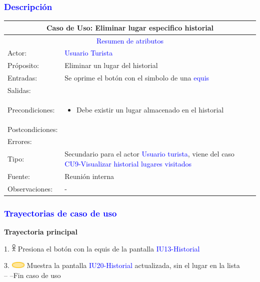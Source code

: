 \subsubsection{\textcolor{blue}{Descripción}}
\begin{tabularx}{16cm}{||l|X||}
	\hline
	\multicolumn{2}{||c||}{Caso de Uso: Eliminar lugar especifico historial} \\
	\hline
	\multicolumn{2}{||c||}{\textcolor{blue}{Resumen de atributos}} \\
	\hline
	{Actor:} & {\textcolor{blue}{Usuario Turista}} \\
	\hline
	{Próposito:} & {Eliminar un lugar del historial} \\
	\hline
	{Entradas:} & {Se oprime el botón con el simbolo de una \textcolor{blue}{equis}}\\
	\hline
	{Salidas:} & {}\\
	\hline
	{Precondiciones:} & {\begin{itemize}
	    \item Debe existir un lugar almacenado en el historial
	\end{itemize}}\\ 
	\hline
	{Postcondiciones:} & {}\\
	\hline
	{Errores:} & {} \\
	\hline
	{Tipo:} & {Secundario para el actor \textcolor{blue}{Usuario turista}, viene del caso \textcolor{blue}{CU9-Visualizar historial lugares visitados}}\\
	\hline
	{Fuente:} & {Reunión interna} \\
	\hline
	{Observaciones:} & {-} \\
	\hline
\end{tabularx}

\pagebreak
\subsubsection{\textcolor{blue}{Trayectorias de caso de uso}}
\textbf{Trayectoria principal}
    
    1. \includegraphics[width=0.0150\textwidth]{Figuras/persona.png} Presiona el botón con la equis de la pantalla \textcolor{blue}{IU13-Historial}

    3. \includegraphics[width=0.0500\textwidth]{Figuras/sistema.png} Muestra la pantalla \textcolor{blue}{IU20-Historial} actualizada, sin el lugar en la lista\\
    -- --Fin caso de uso\\
    
